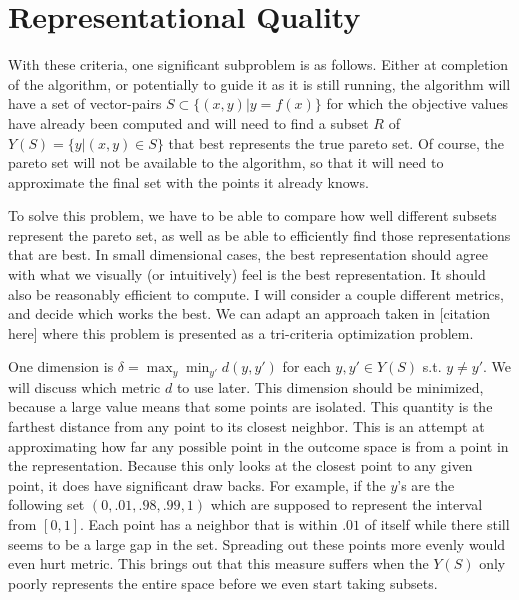 \documentclass{article}
\begin{document}
\section{Representational Quality}

With these criteria, one significant subproblem is as follows.
Either at completion of the algorithm, or potentially to guide it as it is still running, the algorithm 
will have a set of vector-pairs $S \subset \{(x,y) | y = f(x)\}$ for which the objective values have already been computed and will need to find a subset
$R$ of $Y(S) = \{y | (x,y) \in S\}$ that best represents the true pareto set.
Of course, the pareto set will not be available to the algorithm, so that it will need to approximate the final set with the points it already knows.

To solve this problem, we have to be able to compare how well different subsets represent the pareto set, as well as be able to efficiently find those representations that are best.
In small dimensional cases, the best representation should agree with what we visually (or intuitively) feel is the best representation.
It should also be reasonably efficient to compute.
I will consider a couple different metrics, and decide which works the best.
We can adapt an approach taken in [citation here] where this problem is presented as a tri-criteria optimization problem.

One dimension is $\delta = \max_{y} \min_{y'} d(y, y')$ for each $y, y' \in Y(S)$ s.t. $y \ne y'$.
We will discuss which metric $d$ to use later.
This dimension should be minimized, because a large value means that some points are isolated.
This quantity is the farthest distance from any point to its closest neighbor.
This is an attempt at approximating how far any possible point in the outcome space is from a point in the representation.
Because this only looks at the closest point to any given point, it does have significant draw backs.
For example, if the $y$'s are the following set $(0, .01, .98, .99, 1)$ which are supposed to represent the interval from $[0,1]$.
Each point has a neighbor that is within $.01$ of itself while there still seems to be a large gap in the set.
Spreading out these points more evenly would even hurt metric.
This brings out that this measure suffers when the $Y(S)$ only poorly represents the entire space before we even start taking subsets.
\end{document}
